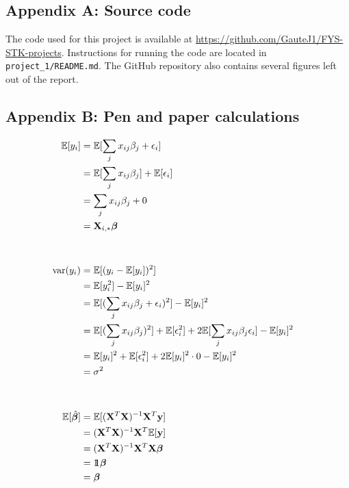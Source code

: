 \subsection{Appendix A: Source code} \label{appendixA}
The code used for this project is available at \url{https://github.com/GauteJ1/FYS-STK-projects}. Instructions for running the code are located in \texttt{ project\_1/README.md}. The GitHub repository also contains several figures left out of the report. 


\subsection{Appendix B: Pen and paper calculations}\label{appendixB}
\begin{align*}
    \mathbb{E}[y_i] & = \mathbb{E}[\sum_j x_{ij}\beta_j + \epsilon_i] \\
    & = \mathbb{E}[\sum_j x_{ij}\beta_j] + \mathbb{E}[\epsilon_i] \\ 
    & = \sum_j x_{ij}\beta_j + 0 \\
    & = \mathbf{X}_{i,*}\boldsymbol{\beta}
    & \\
    & \\
    & \\
    \text{var}(y_i) & = \mathbb{E}[(y_i -\mathbb{E}[y_i])^2] \\
    & = \mathbb{E}[y_i^2] - \mathbb{E}[y_i]^2 \\ 
    & = \mathbb{E}[(\sum_j x_{ij}\beta_j + \epsilon_i)^2] - \mathbb{E}[y_i]^2 \\
    & = \mathbb{E}[(\sum_j x_{ij}\beta_j)^2] + \mathbb{E}[\epsilon_i^2] + 2\mathbb{E}[\sum_j x_{ij}\beta_j \epsilon_i ] - \mathbb{E}[y_i]^2 \\
    & = \mathbb{E}[y_i]^2 + \mathbb{E}[\epsilon_i^2] + 2\mathbb{E}[y_i]^2\cdot 0 - \mathbb{E}[y_i]^2 \\ 
    & = \sigma^2
    &  \\
    &  \\
    &  \\
    \mathbb{E}[\hat{\boldsymbol{\beta}}] & = \mathbb{E}[(\mathbf{X}^T\mathbf{X})^{-1}\mathbf{X}^T \mathbf{y}] \\ 
    & = (\mathbf{X}^T\mathbf{X})^{-1}\mathbf{X}^T \mathbb{E}[\mathbf{y}] \\ 
    & = (\mathbf{X}^T\mathbf{X})^{-1}\mathbf{X}^T \mathbf{X}\boldsymbol{\beta} \\
    & = 1\!\!1 \boldsymbol{\beta} \\
    & = \boldsymbol{\beta} 
\end{align*}

